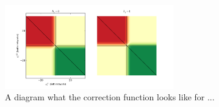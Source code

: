 \begin{figure}[h]
\begin{center}
  \includegraphics[width = 0.65\textwidth]{Assets/correction.png}
\caption{A diagram what the correction function looks like for ...}
\label{F:Correction-Plot}
\end{center}
\end{figure}

%
%
%
%
%
%
%
%
%
%
%
